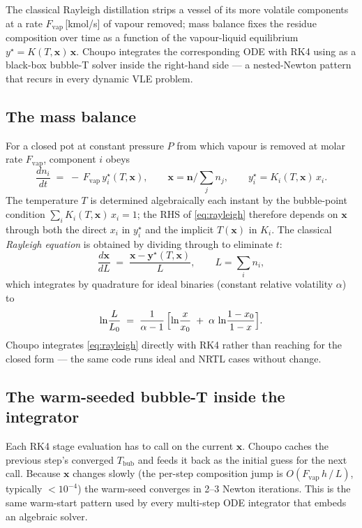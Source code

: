 \documentclass[11pt,a4paper]{article}
\newcommand{\xv}{\mathbf{x}}
\newcommand{\yv}{\mathbf{y}}
\newcommand{\nv}{\mathbf{n}}                          %
\begin{document}
\begin{whatyoulllearn}
The classical Rayleigh distillation strips a vessel of its more
volatile components at a rate $F_{\mathrm{vap}}$\,[kmol/s] of vapour
removed; mass balance fixes the residue composition over time as a
function of the vapour-liquid equilibrium $y^{\star} = K(T, \xv)\,
\xv$.  Choupo integrates the corresponding ODE with RK4 using
 as a black-box bubble-T solver
inside the right-hand side --- a nested-Newton pattern that recurs
in every dynamic VLE problem.
\end{whatyoulllearn}

\subsection*{The mass balance}

For a closed pot at constant pressure $P$ from which vapour is
removed at molar rate $F_{\mathrm{vap}}$, component $i$ obeys
\begin{equation}
    \frac{d n_i}{dt}
    \;=\; -\, F_{\mathrm{vap}}\, y_i^{\star}(T, \xv),
    \qquad
    \xv = \nv / \!\sum_j n_j,
    \qquad
    y_i^{\star} = K_i(T, \xv)\, x_i.
    \label{eq:rayleigh}
\end{equation}
The temperature $T$ is determined algebraically each instant by the
bubble-point condition $\sum_i K_i(T, \xv)\,x_i = 1$; the RHS of
\eqref{eq:rayleigh} therefore depends on $\xv$ through both the
direct $x_i$ in $y_i^{\star}$ and the implicit $T(\xv)$ in $K_i$.
The classical \emph{Rayleigh equation} is obtained by dividing
through to eliminate $t$:
\[
    \frac{d \xv}{d L}
    \;=\; \frac{\xv - \yv^{\star}(T, \xv)}{L},
    \qquad L = \sum_i n_i,
\]
which integrates by quadrature for ideal binaries (constant
relative volatility $\alpha$) to
\[
    \ln\!\frac{L}{L_0}
    \;=\; \frac{1}{\alpha - 1}\,
    \Bigl[\ln\!\frac{x}{x_0}
    \;+\; \alpha\,\ln\!\frac{1 - x_0}{1 - x}\Bigr].
\]
Choupo integrates \eqref{eq:rayleigh} directly with RK4 rather
than reaching for the closed form --- the same code runs ideal and
NRTL cases without change.

\subsection*{The warm-seeded bubble-T inside the integrator}

Each RK4 stage evaluation has to call
 on the current $\xv$.  Choupo caches
the previous step's converged $T_{\mathrm{bub}}$ and feeds it back
as the initial guess for the next call.  Because $\xv$ changes
slowly (the per-step composition jump is
$O(F_{\mathrm{vap}}\,h\, /\, L)$, typically $< 10^{-4}$) the
warm-seed converges in 2--3 Newton iterations.  This is the same
warm-start pattern used by every multi-step ODE integrator that
embeds an algebraic solver.
\end{document}
